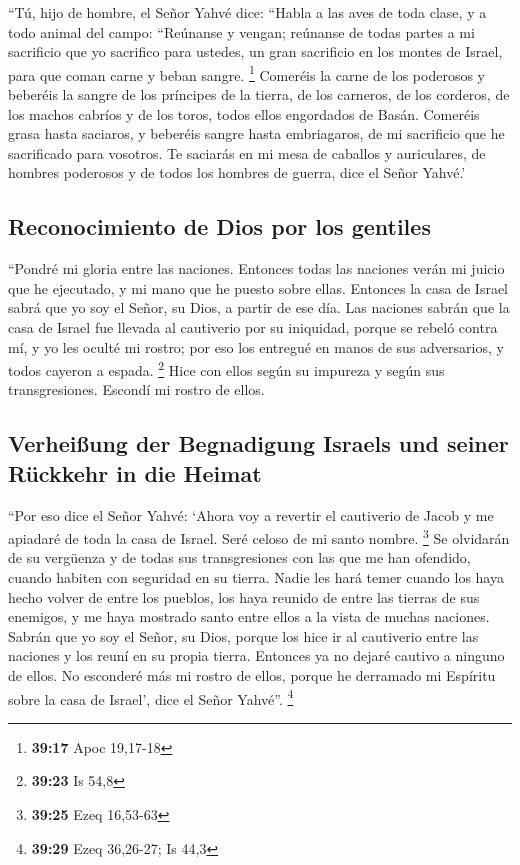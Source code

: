 \begin{paracol}{2}
 ``Tú, hijo de hombre, el Señor Yahvé dice: ``Habla a las
aves de toda clase, y a todo animal del campo: ``Reúnanse y vengan;
reúnanse de todas partes a mi sacrificio que yo sacrifico para ustedes,
un gran sacrificio en los montes de Israel, para que coman carne y beban
sangre. \footnote{\textbf{39:17} Apoc 19,17-18}  Comeréis
la carne de los poderosos y beberéis la sangre de los príncipes de la
tierra, de los carneros, de los corderos, de los machos cabríos y de los
toros, todos ellos engordados de Basán.  Comeréis grasa
hasta saciaros, y beberéis sangre hasta embriagaros, de mi sacrificio
que he sacrificado para vosotros.  Te saciarás en mi mesa
de caballos y auriculares, de hombres poderosos y de todos los hombres
de guerra, dice el Señor Yahvé.'

\hypertarget{reconocimiento-de-dios-por-los-gentiles}{%
\subsection{Reconocimiento de Dios por los
gentiles}\label{reconocimiento-de-dios-por-los-gentiles}}

 ``Pondré mi gloria entre las naciones. Entonces todas
las naciones verán mi juicio que he ejecutado, y mi mano que he puesto
sobre ellas.  Entonces la casa de Israel sabrá que yo soy
el Señor, su Dios, a partir de ese día.  Las naciones
sabrán que la casa de Israel fue llevada al cautiverio por su iniquidad,
porque se rebeló contra mí, y yo les oculté mi rostro; por eso los
entregué en manos de sus adversarios, y todos cayeron a espada.
\footnote{\textbf{39:23} Is 54,8}  Hice con ellos según
su impureza y según sus transgresiones. Escondí mi rostro de ellos.

\hypertarget{verheiuxdfung-der-begnadigung-israels-und-seiner-ruxfcckkehr-in-die-heimat}{%
\subsection{Verheißung der Begnadigung Israels und seiner Rückkehr in
die
Heimat}\label{verheiuxdfung-der-begnadigung-israels-und-seiner-ruxfcckkehr-in-die-heimat}}

 ``Por eso dice el Señor Yahvé: `Ahora voy a revertir el
cautiverio de Jacob y me apiadaré de toda la casa de Israel. Seré celoso
de mi santo nombre. \footnote{\textbf{39:25} Ezeq 16,53-63}
 Se olvidarán de su vergüenza y de todas sus
transgresiones con las que me han ofendido, cuando habiten con seguridad
en su tierra. Nadie les hará temer  cuando los haya hecho
volver de entre los pueblos, los haya reunido de entre las tierras de
sus enemigos, y me haya mostrado santo entre ellos a la vista de muchas
naciones.  Sabrán que yo soy el Señor, su Dios, porque
los hice ir al cautiverio entre las naciones y los reuní en su propia
tierra. Entonces ya no dejaré cautivo a ninguno de ellos.
 No esconderé más mi rostro de ellos, porque he derramado
mi Espíritu sobre la casa de Israel', dice el Señor Yahvé''. \footnote{\textbf{39:29}
  Ezeq 36,26-27; Is 44,3}


\end{paracol}
